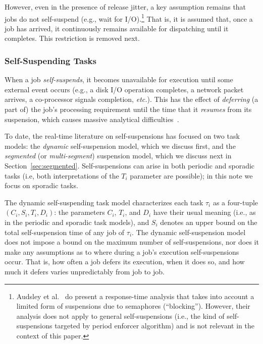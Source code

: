However, even in the presence of release jitter, a key assumption remains that jobs do not self-suspend (e.g., wait for I/O).\footnote{Audsley et al.~\cite{ABRTW:93} do present a response-time analysis that takes into account a limited form of suspensions due to semaphores (``blocking''). However, their analysis does not apply to general self-suspensions (i.e., the kind of self-suspensions targeted by period enforcer algorithm)  and is not relevant in the context of this paper.} That is, it is assumed that, once a job has arrived, it continuously remains available for dispatching until it completes. This restriction is removed next.


\subsubsection{Self-Suspending Tasks}
\label{sec:dynamic}

When a job \emph{self-suspends}, it becomes unavailable for execution until some external event occurs (e.g., a disk I/O operation completes, a network packet arrives, a co-processor signals completion, \textit{etc.}). This has the effect of \emph{deferring} (a part of) the job's processing requirement until the time that it \emph{resumes} from its suspension, which causes massive analytical difficulties~\cite{LSS:87,LSST:91,Ra:90,ABRTW:93,SLS:95,WC16-suspend-DATE,ecrts15nelissen,Ri:04}. 

To date, the real-time literature on self-suspensions has focused on two task models: the \emph{dynamic} self-suspension model, which we discuss first,  and the \emph{segmented} (or \emph{multi-segment}) suspension model, which we discuss next in Section~\ref{sec:segmented}.  Self-suspensions can arise in both periodic and sporadic tasks (i.e, both interpretations of the $T_i$ parameter are possible); in this note we focus on sporadic tasks.

The dynamic self-suspending task model characterizes each
task $\tau_i$ as a four-tuple $(C_i,S_i,T_i,D_i)$: the parameters $C_i$, $T_i$, and $D_i$ have their usual meaning (i.e., as in the periodic and sporadic task models), and $S_i$ denotes an upper bound on the total self-suspension time of any job of $\tau_i$. The dynamic self-suspension model does not impose a bound on the maximum number of self-suspensions, nor does it make any assumptions as to where during a job's execution self-suspensions occur. That is, how often a job defers its execution, when it does so, and how much it defers varies unpredictably from job to job.

